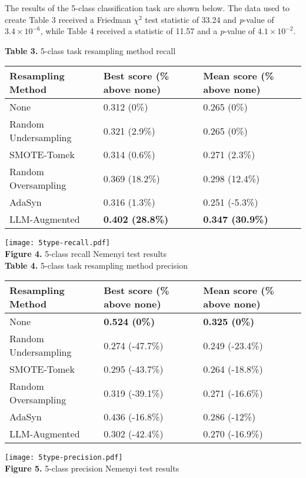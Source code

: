 \documentclass[runningheads]{llncs}
\newenvironment{nscenter}
 {\parskip=0pt\par\nopagebreak\centering}
 {\par\noindent\ignorespacesafterend}
\begin{document}
The results of the 5-class classification task are shown below. The data used to create Table 3 received a Friedman $\chi^2$ test statistic of 33.24 and \emph{p}-value of $3.4 \times 10^{-6}$, while Table 4 received a statistic of 11.57 and a \emph{p}-value of $4.1 \times 10^{-2}$.
\begin{nscenter}
{\bf Table 3.} 5-class task resampling method recall\\

\begin{tabular}{|l|l|l|}
\hline
Resampling Method & Best score (\% above none) & Mean score (\% above none) \\\hline
None & 0.312 (0\%) & 0.265 (0\%) \\\hline
Random Undersampling & 0.321 (2.9\%) & 0.265 (0\%) \\\hline
SMOTE-Tomek & 0.314 (0.6\%) & 0.271 (2.3\%) \\\hline
Random Oversampling & 0.369 (18.2\%) & 0.298 (12.4\%) \\\hline
AdaSyn & 0.316 (1.3\%) & 0.251 (-5.3\%) \\\hline
LLM-Augmented & {\bf 0.402 (28.8\%)} & {\bf 0.347 (30.9\%)} \\\hline
\end{tabular}

\texttt{[image: 5type-recall.pdf]}\\
{\bf Figure 4.} 5-class recall Nemenyi test results\\
\vspace{\baselineskip}
{\bf Table 4.} 5-class task resampling method precision\\

\begin{tabular}{|l|l|l|}
\hline
Resampling Method & Best score (\% above none) & Mean score (\% above none) \\\hline
None & {\bf 0.524 (0\%)} & {\bf 0.325 (0\%)} \\\hline
Random Undersampling & 0.274 (-47.7\%) & 0.249 (-23.4\%) \\\hline
SMOTE-Tomek & 0.295 (-43.7\%) & 0.264 (-18.8\%) \\\hline
Random Oversampling & 0.319 (-39.1\%) & 0.271 (-16.6\%) \\\hline
AdaSyn & 0.436 (-16.8\%) & 0.286 (-12\%) \\\hline
LLM-Augmented & 0.302 (-42.4\%) &  0.270 (-16.9\%) \\\hline
\end{tabular}

\texttt{[image: 5type-precision.pdf]}\\
{\bf Figure 5.} 5-class precision Nemenyi test results
\end{nscenter}
\end{document}

